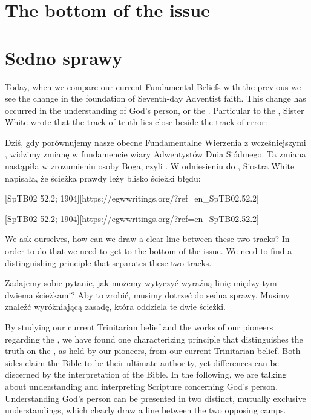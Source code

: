 \chapter{The bottom of the issue}


\chapter{Sedno sprawy}


Today, when we compare our current Fundamental Beliefs with the previous  we see the change in the foundation of Seventh-day Adventist faith. This change has occurred in the understanding of God’s person, or the . Particular to the , Sister White wrote that the track of truth lies close beside the track of error:


Dziś, gdy porównujemy nasze obecne Fundamentalne Wierzenia z wcześniejszymi , widzimy zmianę w fundamencie wiary Adwentystów Dnia Siódmego. Ta zmiana nastąpiła w zrozumieniu osoby Boga, czyli . W odniesieniu do , Siostra White napisała, że ścieżka prawdy leży blisko ścieżki błędu:


[SpTB02 52.2; 1904][https://egwwritings.org/?ref=en\_SpTB02.52.2]


[SpTB02 52.2; 1904][https://egwwritings.org/?ref=en\_SpTB02.52.2]


We ask ourselves, how can we draw a clear line between these two tracks? In order to do that we need to get to the bottom of the issue. We need to find a distinguishing principle that separates these two tracks.


Zadajemy sobie pytanie, jak możemy wytyczyć wyraźną linię między tymi dwiema ścieżkami? Aby to zrobić, musimy dotrzeć do sedna sprawy. Musimy znaleźć wyróżniającą zasadę, która oddziela te dwie ścieżki.


By studying our current Trinitarian belief and the works of our pioneers regarding the , we have found one characterizing principle that distinguishes the truth on the , as held by our pioneers, from our current Trinitarian belief. Both sides claim the Bible to be their ultimate authority, yet differences can be discerned by the interpretation of the Bible. In the following, we are talking about understanding and interpreting Scripture concerning God’s person. Understanding God’s person can be presented in two distinct, mutually exclusive understandings, which clearly draw a line between the two opposing camps.


